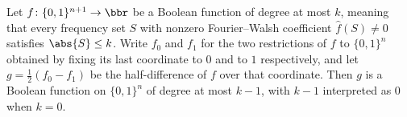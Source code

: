 \begin{lemma}
\leanok
{}
\label{BooleanAnalysis.Hypercontractivity.degree_diffLast}
Let $f\colon\{0,1\}^{n+1}\to\bbr$ be a Boolean function of degree at most $k$, meaning
that every frequency set $S$ with nonzero Fourier--Walsh coefficient $\hat f(S)\ne 0$
satisfies $\abs{S}\le k$. Write $f_0$ and $f_1$ for the two restrictions of $f$ to
$\{0,1\}^{n}$ obtained by fixing its last coordinate to $0$ and to $1$ respectively, and
let $g=\tfrac12(f_0-f_1)$ be the half-difference of $f$ over that coordinate. Then $g$
is a Boolean function on $\{0,1\}^{n}$ of degree at most $k-1$, with $k-1$ interpreted
as $0$ when $k=0$.
\end{lemma}
